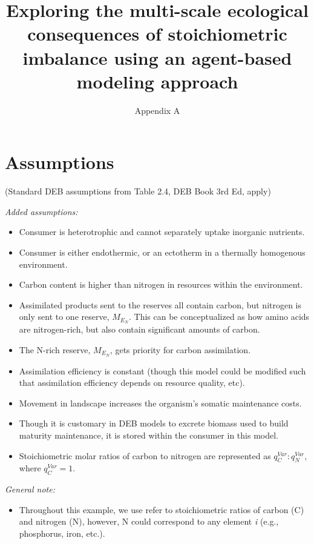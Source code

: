 \documentclass[
]{article}
\title{Exploring the multi-scale ecological consequences of
stoichiometric imbalance using an agent-based modeling approach}
\subtitle{Appendix A}
\author{}
\date{\vspace{-2.5em}}
\providecommand{\tightlist}{%
  \setlength{\itemsep}{0pt}\setlength{\parskip}{0pt}}
\begin{document}
\maketitle

\section{Assumptions}\label{assumptions}

(Standard DEB assumptions from Table 2.4, DEB Book 3rd Ed, apply)

\emph{Added assumptions:}

\begin{itemize}
\tightlist
\item
  Consumer is heterotrophic and cannot separately uptake inorganic
  nutrients.
\item
  Consumer is either endothermic, or an ectotherm in a thermally
  homogenous environment.
\item
  Carbon content is higher than nitrogen in resources within the
  environment.
\item
  Assimilated products sent to the reserves all contain carbon, but
  nitrogen is only sent to one reserve, \(M_{E_N}\). This can be
  conceptualized as how amino acids are nitrogen-rich, but also contain
  significant amounts of carbon.
\item
  The N-rich reserve, \(M_{E_N}\), gets priority for carbon
  assimilation.
\item
  Assimilation efficiency is constant (though this model could be
  modified such that assimilation efficiency depends on resource
  quality, etc).
\item
  Movement in landscape increases the organism's somatic maintenance
  costs.
\item
  Though it is customary in DEB models to excrete biomass used to build
  maturity maintenance, it is stored within the consumer in this model.
\item
  Stoichiometric molar ratios of carbon to nitrogen are represented as
  \(q_{C}^{Var}:q_{N}^{Var}\), where \(q_{C}^{Var}=1\).
\end{itemize}

\emph{General note:}

\begin{itemize}
\tightlist
\item
  Throughout this example, we use refer to stoichiometric ratios of
  carbon (C) and nitrogen (N), however, N could correspond to any
  element \emph{i} (e.g., phosphorus, iron, etc.).
\end{itemize}
\end{document}
